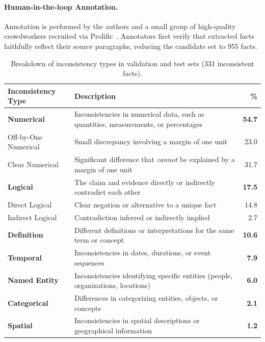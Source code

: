 \paragraph{Human-in-the-loop Annotation.} Annotation is performed by the authors and a small group of high-quality crowdworkers recruited via Prolific~\citep{prolific}. Annotators first verify that extracted facts faithfully reflect their source paragraphs, reducing the candidate set to 955 facts.

\begin{table}[ht!]
\centering
\small
\renewcommand{\arraystretch}{1.2}
\begin{tabular}{@{\hspace{0.5em}}lp{}r@{\hspace{0.5em}}}
    \toprule
    
    \textbf{Inconsistency Type} & \textbf{Description} & \textbf{\%} \\
    
    \midrule
    \rowcolor{actionblue!30}
    \textbf{Numerical} & Inconsistencies in numerical data, such as quantities, measurements, or percentages & \textbf{54.7} \\
    \rowcolor{actionblue!10}
    \quad Off-by-One Numerical & Small discrepancy involving a margin of one unit & 23.0 \\
    \rowcolor{actionblue!10}
    \quad Clear Numerical & Significant difference that \emph{cannot} be explained by a margin of one unit & 31.7 \\
    
    \rowcolor{actionblue!30}
    \textbf{Logical} & The claim and evidence directly or indirectly contradict each other & \textbf{17.5} \\
    \rowcolor{actionblue!10}
    \quad Direct Logical & Clear negation or alternative to a unique fact & 14.8 \\
    \rowcolor{actionblue!10}
    \quad Indirect Logical & Contradiction inferred or indirectly implied & 2.7 \\
    \rowcolor{actionblue!30}
    \textbf{Definition} & Different definitions or interpretations for the same term or concept & \textbf{10.6} \\
    \rowcolor{actionblue!30}
    \textbf{Temporal} & Inconsistencies in dates, durations, or event sequences & \textbf{7.9} \\
    \rowcolor{actionblue!30}
    \textbf{Named Entity} & Inconsistencies identifying specific entities (people, organizations, locations) & \textbf{6.0} \\
    \rowcolor{actionblue!30}
    \textbf{Categorical} & Differences in categorizing entities, objects, or concepts & \textbf{2.1} \\
    \rowcolor{actionblue!30}
    \textbf{Spatial} & Inconsistencies in spatial descriptions or geographical information & \textbf{1.2} \\
    \bottomrule
\end{tabular}
\caption{Breakdown of inconsistency types in \dataset validation and test sets (331 inconsistent facts).}
\label{tab:inconsistency_breakdown}
\end{table}

